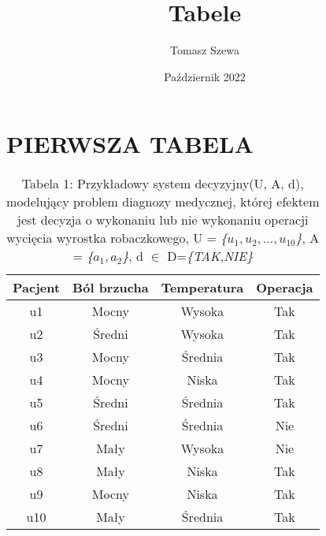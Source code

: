 \documentclass[12pt, letterpaper, titlepage]{article}
\title{Tabele}
\author{Tomasz Szewa}
\date{Październik 2022}
\begin{document}
\maketitle

\section{PIERWSZA TABELA}
\begin{table}[h]
\centering\caption{Tabela 1: Przykładowy system decyzyjny(U, A, d), modelujący problem diagnozy medycznej, której efektem jest decyzja o wykonaniu lub nie wykonaniu operacji wycięcia wyrostka robaczkowego,
U = \textit{{\{$u_1,u_2,...,u_{10}$}\}}, A = \textit{{\{$a_1,a_2$}\}}, d $\in$ D=\textit{{\{TAK,NIE}\}} \newline}
\begin{tabular}{c | c c c}
	\hline
	\hline
	Pacjent & Ból brzucha & Temperatura & Operacja\\
	\hline
	u1 & Mocny & Wysoka & Tak\\	
	
	u2 & Średni & Wysoka & Tak\\
	
	u3 & Mocny & Średnia & Tak\\
	
	u4 & Mocny & Niska & Tak\\
	
	u5 & Średni & Średnia & Tak\\
	
	u6 & Średni & Średnia & Nie\\
	
	u7 & Mały & Wysoka & Nie\\

	u8 & Mały & Niska & Tak\\
	
	u9 & Mocny & Niska & Tak\\
	
	u10 & Mały & Średnia & Tak\\
	\hline
	\hline

\end{tabular}
\end{table}
\end{document}

